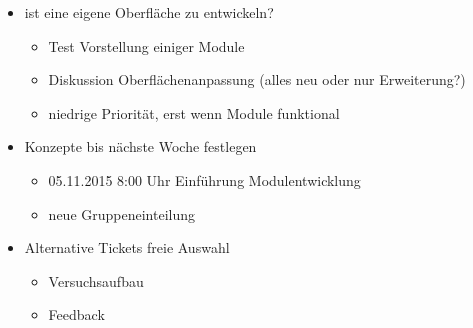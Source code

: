 \begin{itemize}
	\item ist eine eigene Oberfläche zu entwickeln?
	\begin{itemize}
		\item Test Vorstellung einiger Module
		\item Diskussion Oberflächenanpassung (alles neu oder nur Erweiterung?)
		\item niedrige Priorität, erst wenn Module funktional
	\end{itemize}
	
	\item Konzepte bis nächste Woche festlegen

	\begin{itemize}
		\item 05.11.2015 8:00 Uhr Einführung Modulentwicklung
		\item neue Gruppeneinteilung
	\end{itemize}

	\item Alternative Tickets freie Auswahl
	\begin{itemize}
		\item Versuchsaufbau
		\item Feedback
	\end{itemize}
	
\end{itemize}

